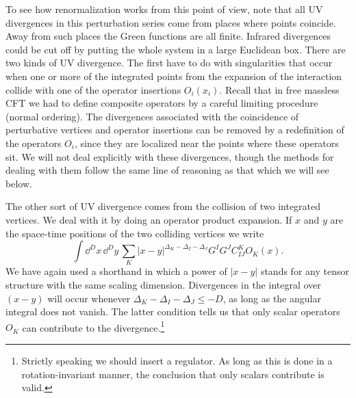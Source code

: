 
To see how renormalization works from this point of view, note that all UV
divergences in this perturbation series come from places where points coincide.
Away from such places the Green functions are all finite. Infrared divergences
could be cut off by putting the whole system in a large Euclidean box. There are
two kinds of UV divergence. The first have to do with singularities that occur
when one or more of the integrated points from the expansion of the interaction
collide with one of the operator insertions $O_i(x_i)$. Recall that in free
massless CFT we had to define composite operators by a careful limiting
procedure (normal ordering). The divergences associated with the coincidence of
perturbative vertices and operator insertions can be removed by a redefinition
of the operators $O_i$, since they are localized near the points where these
operators sit. We will not deal explicitly with these divergences, though the
methods for dealing with them follow the same line of reasoning as that which we
will see below.

The other sort of UV divergence comes from the collision of two integrated
vertices. We deal with it by doing an operator product expansion. If $x$ and $y$
are the space-time positions of the two colliding vertices we write
\[
  \int \dd^{D}x\,\dd^{D}y\,
  \sum_{K}|x-y|^{\Delta_K-\Delta_I-\Delta_J}
  G^{I}G^{J}C_{IJ}^{K}O_{K}(x).
\]
We have again used a shorthand in which a power of $|x-y|$ stands for any tensor
structure with the same scaling dimension. Divergences in the integral over
$(x-y)$ will occur whenever $\Delta_K-\Delta_I-\Delta_J\leq-D$, as long as the
angular integral does not vanish. The latter condition tells us that only scalar
operators $O_K$ can contribute to the divergence.\footnote[7]{Strictly speaking we
should insert a regulator. As long as this is done in a rotation-invariant manner,
the conclusion that only scalars contribute is valid.}
